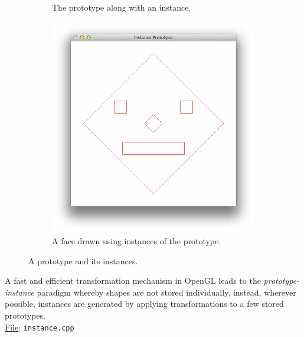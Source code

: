 \documentclass[addpoints]{exam}
\begin{document}
\begin{questions}
\begin{figure}[h]
\begin{subfigure}[b]{.33\textwidth}
    \caption{The prototype along with an instance.}
  \end{subfigure}
  \begin{subfigure}[b]{.33\textwidth}
    \includegraphics[width=\textwidth]{instance3}
    \caption{A face drawn using instances of the prototype.}
  \end{subfigure}
  \caption{A prototype and its instances.}
\end{figure}  

A fast and efficient transformation mechanism in OpenGL leads to the {\it prototype-instance} paradigm whereby shapes are not stored individually, instead, wherever possible, instances are generated by applying transformations to a few stored prototypes.\\
\underline{File}: {\tt instance.cpp}

  

\end{questions}
\end{document}

